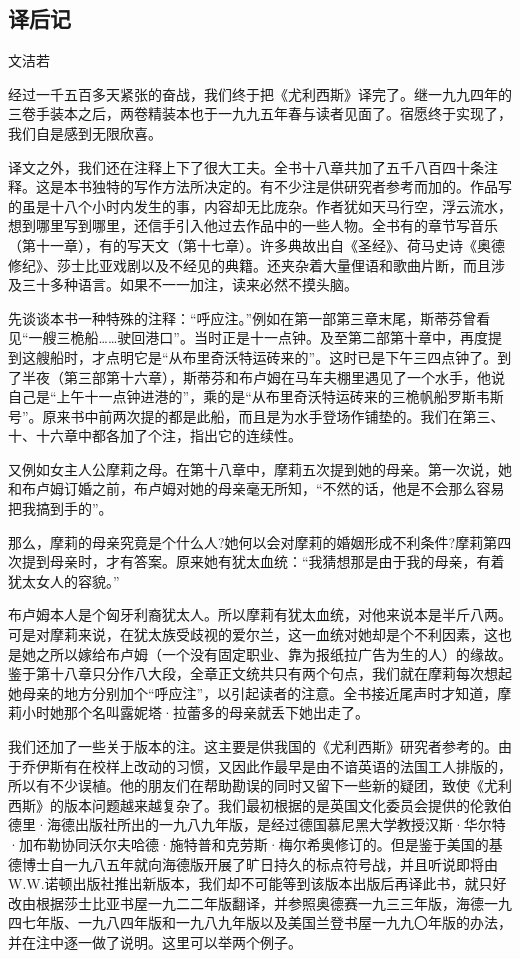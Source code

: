 \clearpage
\subsection*{译后记}

\begin{center}
    \par 文洁若
\end{center}
\par 经过一千五百多天紧张的奋战，我们终于把《尤利西斯》译完了。继一九九四年的三卷手装本之后，两卷精装本也于一九九五年春与读者见面了。宿愿终于实现了，我们自是感到无限欣喜。
\par 译文之外，我们还在注释上下了很大工夫。全书十八章共加了五千八百四十条注释。这是本书独特的写作方法所决定的。有不少注是供研究者参考而加的。作品写的虽是十八个小时内发生的事，内容却无比庞杂。作者犹如天马行空，浮云流水，想到哪里写到哪里，还信手引入他过去作品中的一些人物。全书有的章节写音乐（第十一章），有的写天文（第十七章）。许多典故出自《圣经》、荷马史诗《奥德修纪》、莎士比亚戏剧以及不经见的典籍。还夹杂着大量俚语和歌曲片断，而且涉及三十多种语言。如果不一一加注，读来必然不摸头脑。
\par 先谈谈本书一种特殊的注释：“呼应注。”例如在第一部第三章末尾，斯蒂芬曾看见“一艘三桅船……驶回港口”。当时正是十一点钟。及至第二部第十章中，再度提到这艘船时，才点明它是“从布里奇沃特运砖来的”。这时已是下午三四点钟了。到了半夜（第三部第十六章），斯蒂芬和布卢姆在马车夫棚里遇见了一个水手，他说自己是“上午十一点钟进港的”，乘的是“从布里奇沃特运砖来的三桅帆船罗斯韦斯号”。原来书中前两次提的都是此船，而且是为水手登场作铺垫的。我们在第三、十、十六章中都各加了个注，指出它的连续性。
\par 又例如女主人公摩莉之母。在第十八章中，摩莉五次提到她的母亲。第一次说，她和布卢姆订婚之前，布卢姆对她的母亲毫无所知，“不然的话，他是不会那么容易把我搞到手的”。
\par 那么，摩莉的母亲究竟是个什么人?她何以会对摩莉的婚姻形成不利条件?摩莉第四次提到母亲时，才有答案。原来她有犹太血统：“我猜想那是由于我的母亲，有着犹太女人的容貌。”
\par 布卢姆本人是个匈牙利裔犹太人。所以摩莉有犹太血统，对他来说本是半斤八两。可是对摩莉来说，在犹太族受歧视的爱尔兰，这一血统对她却是个不利因素，这也是她之所以嫁给布卢姆（一个没有固定职业、靠为报纸拉广告为生的人）的缘故。鉴于第十八章只分作八大段，全章正文统共只有两个句点，我们就在摩莉每次想起她母亲的地方分别加个“呼应注”，以引起读者的注意。全书接近尾声时才知道，摩莉小时她那个名叫露妮塔·拉蕾多的母亲就丢下她出走了。
\par 我们还加了一些关于版本的注。这主要是供我国的《尤利西斯》研究者参考的。由于乔伊斯有在校样上改动的习惯，又因此作最早是由不谙英语的法国工人排版的，所以有不少误植。他的朋友们在帮助勘误的同时又留下一些新的疑团，致使《尤利西斯》的版本问题越来越复杂了。我们最初根据的是英国文化委员会提供的伦敦伯德里·海德出版社所出的一九八九年版，是经过德国慕尼黑大学教授汉斯·华尔特·加布勒协同沃尔夫哈德·施特普和克劳斯·梅尔希奥修订的。但是鉴于美国的基德博士自一九八五年就向海德版开展了旷日持久的标点符号战，并且听说即将由W.W.诺顿出版社推出新版本，我们却不可能等到该版本出版后再译此书，就只好改由根据莎士比亚书屋一九二二年版翻译，并参照奥德赛一九三三年版，海德一九四七年版、一九八四年版和一九八九年版以及美国兰登书屋一九九〇年版的办法，并在注中逐一做了说明。这里可以举两个例子。
